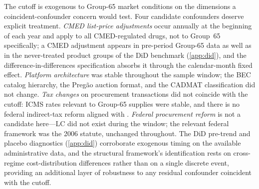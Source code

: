 The cutoff is exogenous to Group-65 market conditions on the dimensions a coincident-confounder concern would test. Four candidate confounders deserve explicit treatment. \emph{CMED list-price adjustments} occur annually at the beginning of each year and apply to all CMED-regulated drugs, not to Group~65 specifically; a CMED adjustment appears in pre-period Group-65 data as well as in the never-treated product groups of the DiD benchmark (\ref{app:did}), and the difference-in-differences specification absorbs it through the calendar-month fixed effect. \emph{Platform architecture} was stable throughout the sample window; the BEC catalog hierarchy, the Preg\~ao auction format, and the CADMAT classification did not change. \emph{Tax changes} on procurement transactions did not coincide with the cutoff: ICMS rates relevant to Group-65 supplies were stable, and there is no federal indirect-tax reform aligned with \policyCutoffMonth{}. \emph{Federal procurement reform} is not a candidate here---LC \leiNova{} did not exist during the window; the relevant federal framework was the 2006 statute, unchanged throughout. The DiD pre-trend and placebo diagnostics (\ref{app:did}) corroborate exogenous timing on the available administrative data, and the structural framework's identification rests on cross-regime cost-distribution differences rather than on a single discrete event, providing an additional layer of robustness to any residual confounder coincident with the cutoff.
